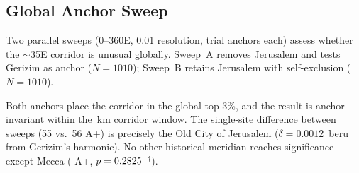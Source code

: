 \documentclass[HARVARD,twocolumn]{USG}
\begin{document}
\subsection{Global Anchor Sweep}
\label{sec:sensitivity_global}

Two parallel sweeps (0--360\textdegree{}E, 0.01\textdegree{} resolution,
\anchorSweepNanchors{} trial anchors each) assess whether the
$\sim$35\textdegree{}E corridor is unusual globally.
Sweep~A removes Jerusalem and tests Gerizim as anchor ($N = 1010$);
Sweep~B retains Jerusalem with self-exclusion ($N = 1010$).

\begin{table}[!t]
\centering\small
\caption{Global anchor sweep: both Levantine anchors ranked within their
  own corpus. Each sweep: \anchorSweepNanchors{} trial anchors,
  0--360\textdegree{}E at 0.01\textdegree{} resolution.
  Sweep~A: N\,=\,1010 (Jerusalem removed); Sweep~B: N\,=\,1010 (Jerusalem self-excluded).
  Gerizim is external in both.
  Mean A+ across all anchors: \anchorSweepApMean{}$\pm$\anchorSweepApStd{}.}
\label{tab:sweep_summary}
\end{table}

Both anchors place the corridor in the global top 3\%, and the result
is anchor-invariant within the \GerizimJerusalemKm\,km corridor window.
The single-site difference between sweeps (55 vs.\ 56 A+) is precisely
the Old City of Jerusalem ($\delta = 0.0012$~beru from Gerizim's
harmonic). No other historical meridian reaches significance except
Mecca (\MeccaAp{} A+, $p = 0.2825$~$^\dagger$).
\end{document}
